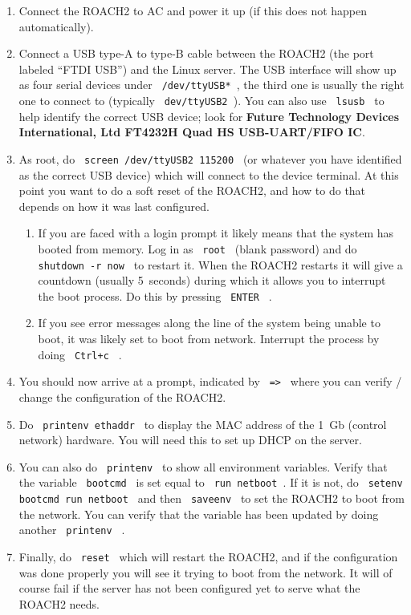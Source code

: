 \documentclass[a4paper,10pt]{article}
\newcommand{\ilcode}[1]{\begingroup
	\setlength{\fboxsep}{1pt}\colorbox{ilcodebg}{\small\tt%
		#1%
	}\endgroup}
\begin{document}
\begin{enumerate}
	\item Connect the ROACH2 to AC and power it up (if this does not 
	happen automatically).
	\item Connect a USB type-A to type-B cable between the ROACH2 (the
	port labeled ``FTDI USB'') and the Linux server. The USB interface
	will show up as four serial devices under \ilcode{/dev/ttyUSB*}, 
	the third one is usually the right one to connect to (typically 
	\ilcode{dev/ttyUSB2}). You can also use \ilcode{lsusb} to help 
	identify the correct USB device; look for {\bf Future 
	Technology Devices International, Ltd FT4232H Quad HS USB-UART/FIFO 
	IC}.
	\item As root, do \ilcode{screen /dev/ttyUSB2 115200} (or whatever
	you have identified as the correct USB device) which will connect to 
	the device terminal. At this point you want to do a soft reset of 
	the ROACH2, and how to do that depends on how it was last configured.
	\begin{enumerate}
		\item If you are faced with a login prompt it likely means that 
		the system has booted from memory. Log in as \ilcode{root} 
		(blank password) and do \ilcode{shutdown -r now} to restart it.
		When the ROACH2 restarts it will give a countdown (usually 
		5~seconds) during which it allows you to interrupt the boot 
		process. Do this by pressing \ilcode{ENTER} .
		\item If you see error messages along the line of the system 
		being unable to boot, it was likely set to boot from network.
		Interrupt the process by doing \ilcode{Ctrl+c} .
	\end{enumerate}
	\item You should now arrive at a prompt, indicated by \ilcode{=>} 
	where you can verify / change the configuration of the ROACH2.
	\item Do \ilcode{printenv ethaddr} to display the MAC address of the 
	1~Gb (control network) hardware. You will need this to set up DHCP
	on the server.
	\item You can also do \ilcode{printenv} to show all environment 
	variables. Verify that the variable \ilcode{bootcmd} is set equal 
	to \ilcode{run netboot}. If it is not, do 
	\ilcode{setenv bootcmd run netboot} and then \ilcode{saveenv} to 
	set the ROACH2 to boot from the network. You can verify that the
	variable has been updated by doing another \ilcode{printenv} .
	\item Finally, do \ilcode{reset} which will restart the ROACH2, and
	if the configuration was done properly you will see it trying to 
	boot from the network. It will of course fail if the server has not 
	been configured yet to serve what the ROACH2 needs.
\end{enumerate}
\end{document}

